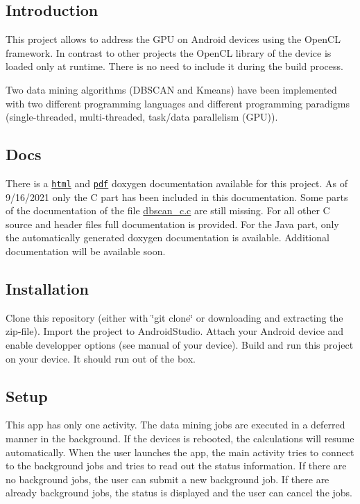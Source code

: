 \subsection*{Introduction}

This project allows to address the G\+PU on Android devices using the Open\+CL framework. In contrast to other projects the Open\+CL library of the device is loaded only at runtime. There is no need to include it during the build process.

Two data mining algorithms (D\+B\+S\+C\+AN and Kmeans) have been implemented with two different programming languages and different programming paradigms (single-\/threaded, multi-\/threaded, task/data parallelism (G\+PU)).

\subsection*{Docs}

There is a \href{app/doc/html/index.html}{\tt html} and \href{app/doc/latex/refman.pdf}{\tt pdf} doxygen documentation available for this project. As of 9/16/2021 only the C part has been included in this documentation. Some parts of the documentation of the file \mbox{\hyperlink{dbscan__c_8c}{dbscan\+\_\+c.\+c}} are still missing. For all other C source and header files full documentation is provided. For the Java part, only the automatically generated doxygen documentation is available. Additional documentation will be available soon.

\subsection*{Installation}

Clone this repository (either with \char`\"{}git clone\char`\"{} or downloading and extracting the zip-\/file). Import the project to Android\+Studio. Attach your Android device and enable developper options (see manual of your device). Build and run this project on your device. It should run out of the box.

\subsection*{Setup}

This app has only one activity. The data mining jobs are executed in a deferred manner in the background. If the devices is rebooted, the calculations will resume automatically. When the user launches the app, the main activity tries to connect to the background jobs and tries to read out the status information. If there are no background jobs, the user can submit a new background job. If there are already background jobs, the status is displayed and the user can cancel the jobs.

